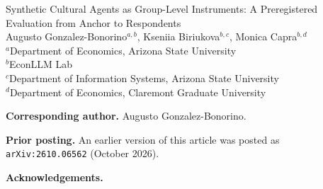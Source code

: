 \documentclass[12pt]{article}
\begin{document}
\thispagestyle{empty}
\begin{center}
{\Large Synthetic Cultural Agents as Group-Level Instruments: A Preregistered Evaluation from Anchor to Respondents}\\[2em]
Augusto Gonzalez-Bonorino$^{a,b}$, Kseniia Biriukova$^{b,c}$, Monica Capra$^{b,d}$\\[1em]
{\small
$^a$Department of Economics, Arizona State University\\
$^b$EconLLM Lab\\
$^c$Department of Information Systems, Arizona State University\\
$^d$Department of Economics, Claremont Graduate University}
\end{center}

\vspace{2em}
\noindent\textbf{Corresponding author.} Augusto Gonzalez-Bonorino. %

\vspace{1em}
\noindent\textbf{Prior posting.} An earlier version of this article was posted as \texttt{arXiv:2610.06562} (October 2026). %

\vspace{1em}
\noindent\textbf{Acknowledgements.} %
\end{document}
